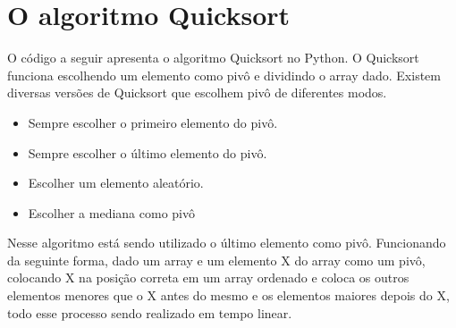     
    \section{O algoritmo Quicksort}
    O código a seguir apresenta o algoritmo Quicksort no Python. O Quicksort funciona escolhendo um elemento como pivô e dividindo o array dado. Existem diversas versões de Quicksort que escolhem pivô de diferentes modos.
    \begin{itemize}
    	\item Sempre escolher o primeiro elemento do pivô.
    	\item Sempre escolher o último elemento do pivô.
    	\item Escolher um elemento aleatório.
    	\item Escolher a mediana como pivô
    \end{itemize}
	Nesse algoritmo está sendo utilizado o último elemento como pivô. Funcionando da seguinte forma, dado um array e um elemento X do array como um pivô, colocando X na posição correta em um array ordenado e coloca os outros elementos menores que o X antes do mesmo e os elementos maiores depois do X, todo esse processo sendo realizado em tempo linear.
